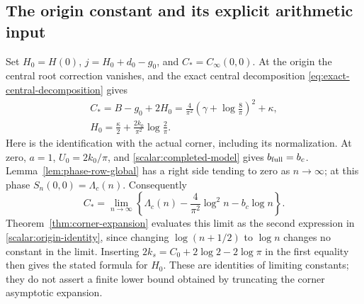\subsection{The origin constant and its explicit arithmetic input}

Set $H_0=H(0)$, $j=H_0+d_0-g_0$, and $C_*=C_\infty(0,0)$.
At the origin the central root correction vanishes, and the exact
central decomposition \eqref{eq:exact-central-decomposition} gives
\begin{equation}\label{scalar:origin-identity}
 \begin{gathered}
 C_*=B-g_0+2H_0
 =\frac4{\pi^2}\left(\gamma+\log\frac8\pi\right)^2+\kappa,\\
 H_0=\frac\kappa2+\frac{2k_0}{\pi^2}\log\frac2\pi.
 \end{gathered}
\end{equation}
Here is the identification with the actual corner, including its
normalization.  At zero, $a=1$, $U_0=2k_0/\pi$, and
\eqref{scalar:completed-model} gives $b_{\rm full}=b_c$.
Lemma~\ref{lem:phase-row-global} has a right side tending to zero as
$n\to\infty$; at this phase $S_n(0,0)=\Lambda_c(n)$.  Consequently
\[
 C_*=\lim_{n\to\infty}
 \left\{\Lambda_c(n)-\frac4{\pi^2}\log^2n-b_c\log n\right\}.
\]
Theorem~\ref{thm:corner-expansion} evaluates this limit as the second
expression in \eqref{scalar:origin-identity}, since changing
$\log(n+1/2)$ to $\log n$ changes no constant in the limit.  Inserting
$2k_s=C_0+2\log2-2\log\pi$ in the first equality then gives the
stated formula for $H_0$.  These are identities of limiting constants;
they do not assert a finite lower bound obtained by truncating the
corner asymptotic expansion.

